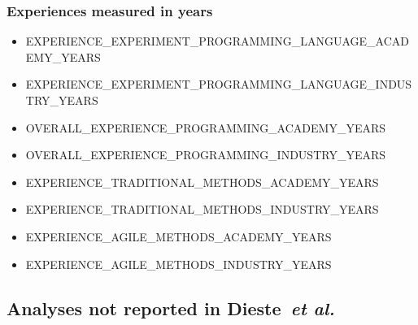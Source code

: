 \documentclass[10pt,conference]{IEEEtran}\usepackage[]{graphicx}\usepackage[table,xcdraw]{xcolor}
\newcommand{\etal}[0]{~\textit{et al.}}
\begin{document}
\subsubsection{Experiences measured in years}
\begin{itemize}
    \item EXPERIENCE\_EXPERIMENT\_PROGRAMMING\_LANGUAGE\_ACADEMY\_YEARS
    \item EXPERIENCE\_EXPERIMENT\_PROGRAMMING\_LANGUAGE\_INDUSTRY\_YEARS
    \item OVERALL\_EXPERIENCE\_PROGRAMMING\_ACADEMY\_YEARS
    \item OVERALL\_EXPERIENCE\_PROGRAMMING\_INDUSTRY\_YEARS
    \item EXPERIENCE\_TRADITIONAL\_METHODS\_ACADEMY\_YEARS
    \item EXPERIENCE\_TRADITIONAL\_METHODS\_INDUSTRY\_YEARS
    \item EXPERIENCE\_AGILE\_METHODS\_ACADEMY\_YEARS
    \item EXPERIENCE\_AGILE\_METHODS\_INDUSTRY\_YEARS
\end{itemize}

\newpage

\subsection{Analyses not reported in Dieste\etal \cite{dieste2018empirical}}\label{sec:appendix:missing-analyses}



\end{document}
